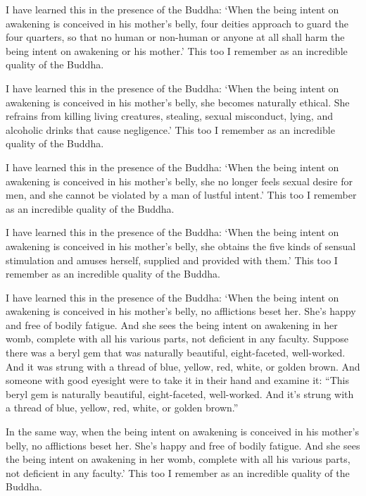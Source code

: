 \documentclass[12pt,openany]{book}%
\begin{document}
I have learned this in the presence of the Buddha: ‘When the being intent on awakening is conceived in his mother’s belly, four deities approach to guard the four quarters, so that no human or non-human or anyone at all shall harm the being intent on awakening or his mother.’ This too I remember as an incredible quality of the Buddha. 

I have learned this in the presence of the Buddha: ‘When the being intent on awakening is conceived in his mother’s belly, she becomes naturally ethical. She refrains from killing living creatures, stealing, sexual misconduct, lying, and alcoholic drinks that cause negligence.’ This too I remember as an incredible quality of the Buddha. 

I have learned this in the presence of the Buddha: ‘When the being intent on awakening is conceived in his mother’s belly, she no longer feels sexual desire for men, and she cannot be violated by a man of lustful intent.’ This too I remember as an incredible quality of the Buddha. 

I have learned this in the presence of the Buddha: ‘When the being intent on awakening is conceived in his mother’s belly, she obtains the five kinds of sensual stimulation and amuses herself, supplied and provided with them.’ This too I remember as an incredible quality of the Buddha. 

I have learned this in the presence of the Buddha: ‘When the being intent on awakening is conceived in his mother’s belly, no afflictions beset her. She’s happy and free of bodily fatigue. And she sees the being intent on awakening in her womb, complete with all his various parts, not deficient in any faculty. Suppose there was a beryl gem that was naturally beautiful, eight-faceted, well-worked. And it was strung with a thread of blue, yellow, red, white, or golden brown. And someone with good eyesight were to take it in their hand and examine it: “This beryl gem is naturally beautiful, eight-faceted, well-worked. And it’s strung with a thread of blue, yellow, red, white, or golden brown.” 

In the same way, when the being intent on awakening is conceived in his mother’s belly, no afflictions beset her. She’s happy and free of bodily fatigue. And she sees the being intent on awakening in her womb, complete with all his various parts, not deficient in any faculty.’ This too I remember as an incredible quality of the Buddha. 
\end{document}
